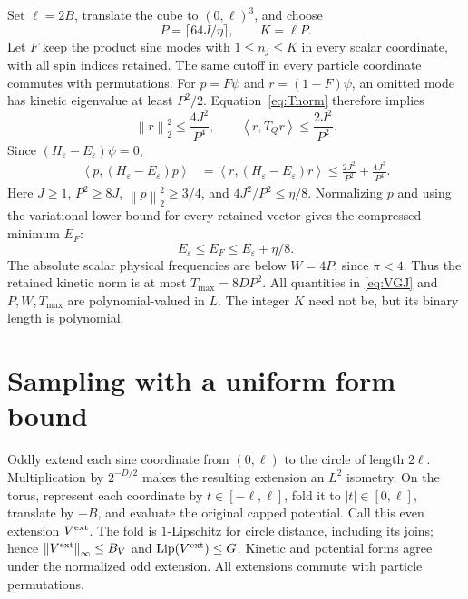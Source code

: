 \documentclass[11pt]{article}
\theoremstyle{remark}\newtheorem{remark}[theorem]{Remark}
\newcommand{\norm}[1]{\left\lVert#1\right\rVert}
\newcommand{\ip}[2]{\left\langle#1,#2\right\rangle}
\numberwithin{equation}{section}
\begin{document}
Set $\ell=2B$, translate the cube to $(0,\ell)^3$, and choose
\begin{equation}\label{eq:P}
 P=\lceil64J/\eta\rceil,\qquad K=\ell P.
\end{equation}
Let $F$ keep the product sine modes with $1\leq n_j\leq K$ in every scalar
coordinate, with all spin indices retained. The same cutoff in every
particle coordinate commutes with permutations. For $p=F\psi$ and
$r=(1-F)\psi$, an omitted mode has kinetic eigenvalue at least $P^2/2$.
Equation~\eqref{eq:Tnorm} therefore implies
\begin{equation}\label{eq:tails}
 \norm r_2^2\leq\frac{4J^2}{P^4},\qquad
 \ip r{T_Qr}\leq\frac{2J^2}{P^2}.
\end{equation}
Since $(H_\varepsilon-E_\varepsilon)\psi=0$,
\begin{align*}
 \ip p{(H_\varepsilon-E_\varepsilon)p}
 &=\ip r{(H_\varepsilon-E_\varepsilon)r}
 \leq\frac{2J^2}{P^2}+\frac{4J^3}{P^4}.
\end{align*}
Here $J\geq1$, $P^2\geq8J$, $\norm p_2^2\geq3/4$, and
$4J^2/P^2\leq\eta/8$. Normalizing $p$ and using the variational lower
bound for every retained vector gives the compressed minimum $E_F$:
\begin{equation}\label{eq:Ritz}
 E_\varepsilon\leq E_F\leq E_\varepsilon+\eta/8.
\end{equation}
The absolute scalar physical frequencies are below $W=4P$, since $\pi<4$.
Thus the retained kinetic norm is at most $T_{\max}=8DP^2$.
All quantities in \eqref{eq:VGJ} and $P,W,T_{\max}$ are polynomial-valued
in $L$. The integer $K$ need not be, but its binary length is polynomial.

\section{Sampling with a uniform form bound}
\label{sec:sampling}
Oddly extend each sine coordinate from $(0,\ell)$ to the circle of length
$2\ell$. Multiplication by $2^{-D/2}$ makes the resulting extension an
$L^2$ isometry. On the torus, represent each coordinate by
$t\in[-\ell,\ell]$, fold it to $|t|\in[0,\ell]$, translate by $-B$, and
evaluate the original capped potential. Call this even extension
$V^{\rm ext}$. The fold is $1$-Lipschitz for circle distance, including its
joins; hence
$\norm{V^{\rm ext}}_\infty\leq B_V$ and
$\operatorname{Lip}(V^{\rm ext})\leq G$.
Kinetic and potential forms agree under the normalized odd extension.
All extensions commute with particle permutations.
\end{document}
